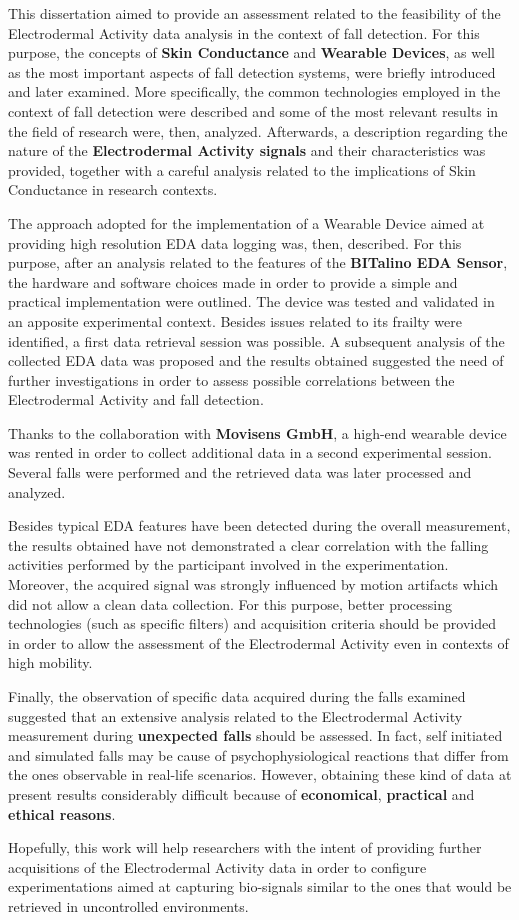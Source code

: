 \label{ch:conclusions}

This dissertation aimed to provide an assessment related to the feasibility of the Electrodermal Activity data analysis in the context of fall detection. For this purpose, the concepts of \textbf{Skin Conductance} and \textbf{Wearable Devices}, as well as the most important aspects of fall detection systems, were briefly introduced and later examined. More specifically, the common technologies employed in the context of fall detection were described and some of the most relevant results in the field of research were, then, analyzed. Afterwards, a description regarding the nature of the \textbf{Electrodermal Activity signals} and their characteristics was provided, together with a careful analysis related to the implications of Skin Conductance in research contexts.

The approach adopted for the implementation of a Wearable Device aimed at providing high resolution EDA data logging was, then, described. For this purpose, after an analysis related to the features of the \textbf{BITalino EDA Sensor}, the hardware and software choices made in order to provide a simple and practical implementation were outlined. The device was tested and validated in an apposite experimental context. Besides issues related to its frailty were identified, a first data retrieval session was possible. A subsequent analysis of the collected EDA data was proposed and the results obtained suggested the need of further investigations in order to assess possible correlations between the Electrodermal Activity and fall detection.

Thanks to the collaboration with \textbf{Movisens GmbH}, a high-end wearable device was rented in order to collect additional data in a second experimental session. Several falls were performed and the retrieved data was later processed and analyzed.

Besides typical EDA features have been detected during the overall measurement, the results obtained have not demonstrated a clear correlation with the falling activities performed by the participant involved in the experimentation. Moreover, the acquired signal was strongly influenced by motion artifacts which did not allow a clean data collection. For this purpose, better processing technologies (such as specific filters) and acquisition criteria should be provided in order to allow the assessment of the Electrodermal Activity even in contexts of high mobility.

Finally, the observation of specific data acquired during the falls examined suggested that an extensive analysis related to the Electrodermal Activity measurement during \textbf{unexpected falls} should be assessed. In fact, self initiated and simulated falls may be cause of psychophysiological reactions that differ from the ones observable in real-life scenarios. However, obtaining these kind of data at present results considerably difficult because of \textbf{economical}, \textbf{practical} and \textbf{ethical reasons}.

Hopefully, this work will help researchers with the intent of providing further acquisitions of the Electrodermal Activity data in order to configure experimentations aimed at capturing bio-signals similar to the ones that would be retrieved in uncontrolled environments.


